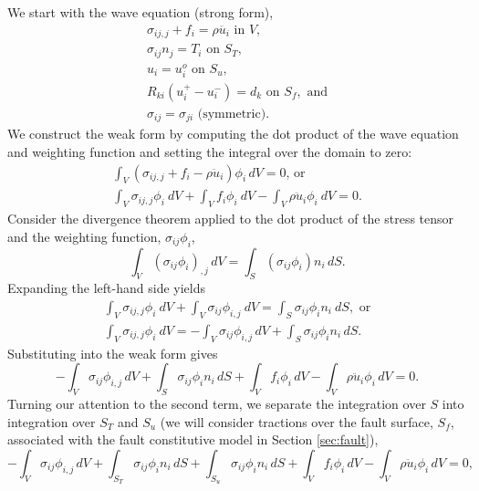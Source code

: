 We start with the wave equation (strong form),
\begin{gather}
\sigma_{ij,j}+f_{i}=\rho\ddot{u_{i}}\text{ in }V,\\
\sigma_{ij}n_{j}=T_{i}\text{ on }S_{T},\\
u_{i}=u_{i}^{o}\text{ on }S_{u},\\
R_{ki}(u_{i}^{+}-u_{i}^{-})=d_{k}\text{ on }S_{f},\text{ and}\\
\sigma_{ij}=\sigma_{ji}\text{ (symmetric).}
\end{gather}
We construct the weak form by computing the dot product of the wave
equation and weighting function and setting the integral over the
domain to zero:
\begin{gather}
\int_{V}\left(\sigma_{ij,j}+f_{i}-\rho\ddot{u}_{i}\right)\phi_{i}\, dV=0\text{, or }\\
\int_{V}\sigma_{ij,j}\phi_{i}\: dV+\int_{V}f_{i}\phi_{i}\: dV-\int_{V}\rho\ddot{u}_{i}\phi_{i}\: dV=0.
\end{gather}
 Consider the divergence theorem applied to the dot product of the
stress tensor and the weighting function, $\sigma_{ij}\phi_{i}$,
\begin{equation}
\int_{V}(\sigma_{ij}\phi_{i})_{,j}\, dV=\int_{S}(\sigma_{ij}\phi_{i})n_{i}\, dS.
\end{equation}
Expanding the left-hand side yields
\begin{gather}
\int_{V}\sigma_{ij,j}\phi_{i}\: dV+\int_{V}\sigma_{ij}\phi_{i,j}\: dV=\int_{S}\sigma_{ij}\phi_{i}n_{i}\: dS,\text{ or}\\
\int_{V}\sigma_{ij,j}\phi_{i}\: dV=-\int_{V}\sigma_{ij}\phi_{i,j}\, dV+\int_{S}\sigma_{ij}\phi_{i}n_{i}\, dS.
\end{gather}
Substituting into the weak form gives
\begin{equation}
-\int_{V}\sigma_{ij}\phi_{i,j}\, dV+\int_{S}\sigma_{ij}\phi_{i}n_{i}\, dS+\int_{V}f_{i}\phi_{i}\, dV-\int_{V}\rho\ddot{u}_{i}\phi_{i}\, dV=0.
\end{equation}
Turning our attention to the second term, we separate the integration
over $S$ into integration over $S_{T}$ and $S_{u}$ (we will consider
tractions over the fault surface, $S_{f}$, associated with the fault
constitutive model in Section \vref{sec:fault}),
\begin{equation}
-\int_{V}\sigma_{ij}\phi_{i,j}\, dV+\int_{S_{T}}\sigma_{ij}\phi_{i}n_{i}\, dS+\int_{S_{u}}\sigma_{ij}\phi_{i}n_{i}\, dS+\int_{V}f_{i}\phi_{i}\, dV-\int_{V}\rho\ddot{u}_{i}\phi_{i}\, dV=0,
\end{equation}
